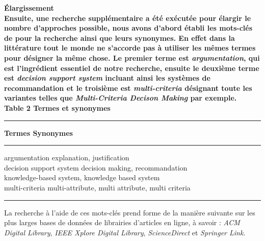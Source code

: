 \documentclass[a4paper, 11pt]{article}
\renewcommand{\textbf}[1]{\begingroup\bfseries\mathversion{bold}#1\endgroup}
\begin{document}
\vspace{1cm}

\newpage

\noindent \textbf{Élargissement}\\

Ensuite, une recherche supplémentaire a été exécutée pour élargir le nombre d'approches possible, nous avons d'abord établi les mots-clés de pour la recherche ainsi que leurs synonymes. En effet dans la littérature tout le monde ne s'accorde pas à utiliser les mêmes termes pour désigner la même chose. Le premier terme est \textit{argumentation}, qui est l'ingrédient essentiel de notre recherche, ensuite le deuxième terme est \textit{decision support system} incluant ainsi les systèmes de recommandation et le troisième est \textit{multi-criteria} désignant toute les variantes telles que \textit{Multi-Criteria Decison Making} par exemple.\\


\noindent \textbf{Table 2} Termes et synonymes
\begin{center}
\begin{minipage}{0.8\textwidth}
\hrule \vspace{.2cm}
\noindent	\textbf{Termes}  	\hspace*{2.3cm}		\textbf{Synonymes}
\vspace{.2cm}
\hrule \vspace{.2cm}
\noindent argumentation  \hspace*{1.75cm} 	explanation, justification \\
    decision support system \hspace*{.2cm}	decision making, recommandation \\
 \hspace*{4.3cm}   knowledge-based system, knowledge based system\\
    multi-criteria 		\hspace*{2cm} multi-attribute, multi attribute, multi criteria
   \vspace{.2cm}
\hrule
\vspace{1cm}
\end{minipage}
\end{center}
\vspace{-.7cm}
La recherche à l'aide de ces mots-clés prend forme de la manière suivante sur les plus larges bases de données de librairies d'articles en ligne, à savoir : \textit{ACM Digital Library}, \textit{IEEE Xplore Digital Library}, \textit{ScienceDirect} et \textit{Springer Link}.\\
\end{document}
